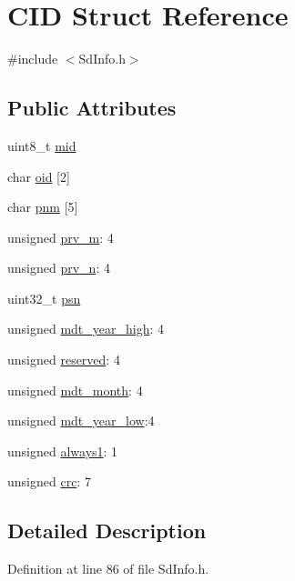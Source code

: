 \hypertarget{struct_c_i_d}{}\section{C\+ID Struct Reference}
\label{struct_c_i_d}


{\ttfamily \#include $<$Sd\+Info.\+h$>$}

\subsection*{Public Attributes}
\begin{DoxyCompactItemize}
\item 
uint8\+\_\+t \hyperlink{struct_c_i_d_addb3f98dd20ccc0ffdf300d5ef9c6333}{mid}
\item 
char \hyperlink{struct_c_i_d_a12cb950aa46c62c8af1e530006f97031}{oid} \mbox{[}2\mbox{]}
\item 
char \hyperlink{struct_c_i_d_a6484cd56fc4bacfa815c12d8682129ba}{pnm} \mbox{[}5\mbox{]}
\item 
unsigned \hyperlink{struct_c_i_d_a7735b6ae8914c4731de30de32c0ac75c}{prv\+\_\+m}\+: 4
\item 
unsigned \hyperlink{struct_c_i_d_a15237f61edb06b3b6dd25b8c1f15280a}{prv\+\_\+n}\+: 4
\item 
uint32\+\_\+t \hyperlink{struct_c_i_d_ada215f8541fa46078461d8da9574fc5e}{psn}
\item 
unsigned \hyperlink{struct_c_i_d_a77cd7bf11f5d63fbcb4b2eec2559b645}{mdt\+\_\+year\+\_\+high}\+: 4
\item 
unsigned \hyperlink{struct_c_i_d_a458794d915efa88aef06f5b0612895ac}{reserved}\+: 4
\item 
unsigned \hyperlink{struct_c_i_d_a8b0c4317cc18c03335d7cde147aa8e8d}{mdt\+\_\+month}\+: 4
\item 
unsigned \hyperlink{struct_c_i_d_ac36633e5eef5d901fe999aad7862508b}{mdt\+\_\+year\+\_\+low}\+:4
\item 
unsigned \hyperlink{struct_c_i_d_af14e08ffbcafb218efae70ad5b8f2c51}{always1}\+: 1
\item 
unsigned \hyperlink{struct_c_i_d_a69b946a732f93b7a66aff4002ca00b77}{crc}\+: 7
\end{DoxyCompactItemize}


\subsection{Detailed Description}


Definition at line 86 of file Sd\+Info.\+h.



